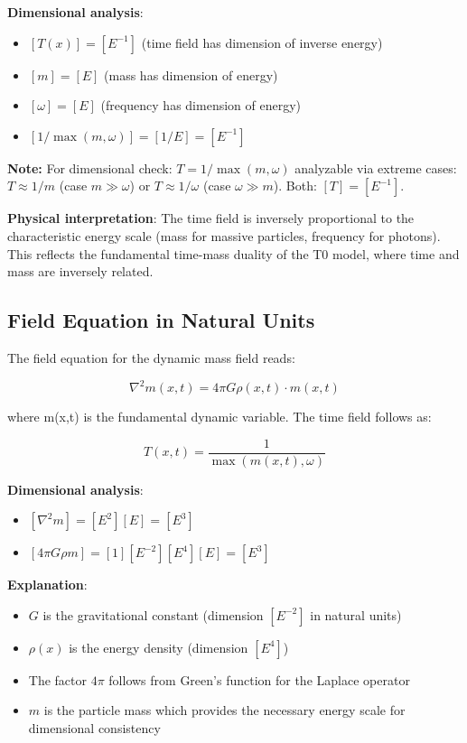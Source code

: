 \documentclass[12pt,a4paper]{article}
\begin{document}
	\textbf{Dimensional analysis}: 
	\begin{itemize}
		\item $[T(x)] = [E^{-1}]$ (time field has dimension of inverse energy)
		\item $[m] = [E]$ (mass has dimension of energy)
		\item $[\omega] = [E]$ (frequency has dimension of energy)
		\item $[1/\max(m, \omega)] = [1/E] = [E^{-1}]$ \checkmark
	\end{itemize}
	\textbf{Note:} For dimensional check: $T = 1/\max(m,\omega)$ analyzable via extreme cases: $T \approx 1/m$ (case $m \gg \omega$) or $T \approx 1/\omega$ (case $\omega \gg m$). Both: $[T] = [E^{-1}]$.
	
	\textbf{Physical interpretation}: The time field is inversely proportional to the characteristic energy scale (mass for massive particles, frequency for photons). This reflects the fundamental time-mass duality of the T0 model, where time and mass are inversely related.
	
	\subsection{Field Equation in Natural Units}
	\label{subsec:field_equation}
	
	The field equation for the dynamic mass field reads:
	
	\begin{equation}
		\label{eq:field_equation}
		\nabla^2 m(x,t) = 4\pi G \rho(x,t) \cdot m(x,t)
	\end{equation}
	
	where m(x,t) is the fundamental dynamic variable. The time field follows as:
	
	\begin{equation}
		T(x,t) = \frac{1}{\max(m(x,t), \omega)}
	\end{equation}
	
	\textbf{Dimensional analysis}: 
	\begin{itemize}
		\item $[\nabla^2 m] = [E^2][E] = [E^3]$
		\item $[4\pi G \rho m] = [1][E^{-2}][E^4][E] = [E^3]$ \checkmark
	\end{itemize}
	
	\textbf{Explanation}: 
	\begin{itemize}
		\item $G$ is the gravitational constant (dimension $[E^{-2}]$ in natural units)
		\item $\rho(x)$ is the energy density (dimension $[E^4]$)
		\item The factor $4\pi$ follows from Green's function for the Laplace operator
		\item $m$ is the particle mass which provides the necessary energy scale for dimensional consistency
	\end{itemize}
	
\end{document}
